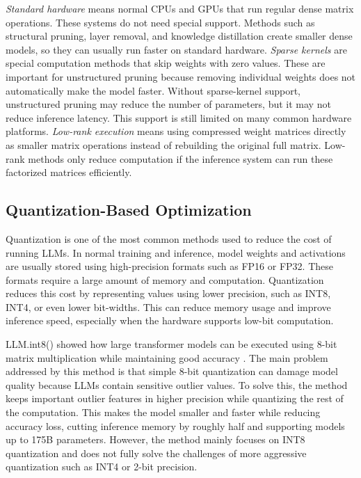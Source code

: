 \documentclass[
11pt, %
english, %
singlespacing, %
headsepline, %
]{MastersDoctoralThesis} %
\begin{document}
\emph{Standard hardware} means normal CPUs and GPUs that run regular dense matrix operations. These systems do not need special support. Methods such as structural pruning, layer removal, and knowledge distillation create smaller dense models, so they can usually run faster on standard hardware. \emph{Sparse kernels} are special computation methods that skip weights with zero values. These are important for unstructured pruning because removing individual weights does not automatically make the model faster. Without sparse-kernel support, unstructured pruning may reduce the number of parameters, but it may not reduce inference latency. This support is still limited on many common hardware platforms. \emph{Low-rank execution} means using compressed weight matrices directly as smaller matrix operations instead of rebuilding the original full matrix. Low-rank methods only reduce computation if the inference system can run these factorized matrices efficiently.

\subsection{Quantization-Based Optimization}

Quantization is one of the most common methods used to reduce the cost of running LLMs. In normal training and inference, model weights and activations are usually stored using high-precision formats such as FP16 or FP32. These formats require a large amount of memory and computation. Quantization reduces this cost by representing values using lower precision, such as INT8, INT4, or even lower bit-widths. This can reduce memory usage and improve inference speed, especially when the hardware supports low-bit computation.

LLM.int8() showed how large transformer models can be executed using 8-bit matrix multiplication while maintaining good accuracy \cite{dettmers2022llmint8}. The main problem addressed by this method is that simple 8-bit quantization can damage model quality because LLMs contain sensitive outlier values. To solve this, the method keeps important outlier features in higher precision while quantizing the rest of the computation. This makes the model smaller and faster while reducing accuracy loss, cutting inference memory by roughly half and supporting models up to 175B parameters. However, the method mainly focuses on INT8 quantization and does not fully solve the challenges of more aggressive quantization such as INT4 or 2-bit precision.
\end{document}
